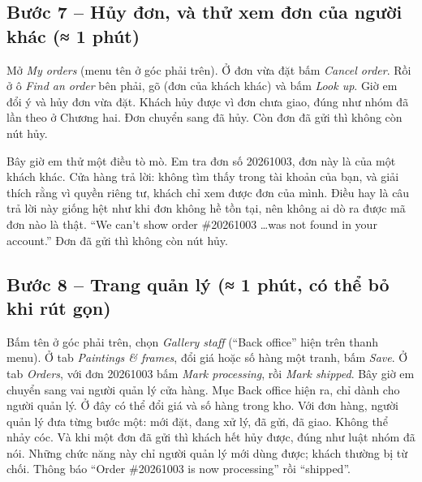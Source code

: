 \subsection{Bước 7 -- Hủy đơn, và thử xem đơn của người khác \normalfont\small(≈ 1 phút)}
Mở \emph{My orders} (menu tên ở góc phải trên). Ở đơn vừa đặt bấm \emph{Cancel order}. Rồi ở ô \emph{Find an order} bên phải, gõ  (đơn của khách khác) và bấm \emph{Look up}.
Giờ em đổi ý và hủy đơn vừa đặt.  Khách hủy được vì đơn chưa giao, đúng như nhóm đã lần theo ở Chương hai. Đơn chuyển sang đã hủy. Còn đơn đã gửi thì không còn nút hủy.

Bây giờ em thử một điều tò mò.  Em tra đơn số 20261003, đơn này là của một khách khác. Cửa hàng trả lời: không tìm thấy trong tài khoản của bạn, và giải thích rằng vì quyền riêng tư, khách chỉ xem được đơn của mình. Điều hay là câu trả lời này giống hệt như khi đơn không hề tồn tại, nên không ai dò ra được mã đơn nào là thật.
``We can't show order \#20261003 \ldots was not found in your account.'' Đơn đã gửi thì không còn nút hủy.

\subsection{Bước 8 -- Trang quản lý \normalfont\small(≈ 1 phút, có thể bỏ khi rút gọn)}
Bấm tên ở góc phải trên, chọn \emph{Gallery staff} (``Back office'' hiện trên thanh menu). Ở tab \emph{Paintings \& frames}, đổi giá hoặc số hàng một tranh, bấm \emph{Save}. Ở tab \emph{Orders}, với đơn 20261003 bấm \emph{Mark processing}, rồi \emph{Mark shipped}.
Bây giờ em chuyển sang vai người quản lý cửa hàng.  Mục Back office hiện ra, chỉ dành cho người quản lý.  Ở đây có thể đổi giá và số hàng trong kho.  Với đơn hàng, người quản lý đưa từng bước một: mới đặt, đang xử lý, đã gửi, đã giao. Không thể nhảy cóc. Và khi một đơn đã gửi thì khách hết hủy được, đúng như luật nhóm đã nói. Những chức năng này chỉ người quản lý mới dùng được; khách thường bị từ chối.
Thông báo ``Order \#20261003 is now processing'' rồi ``shipped''.

